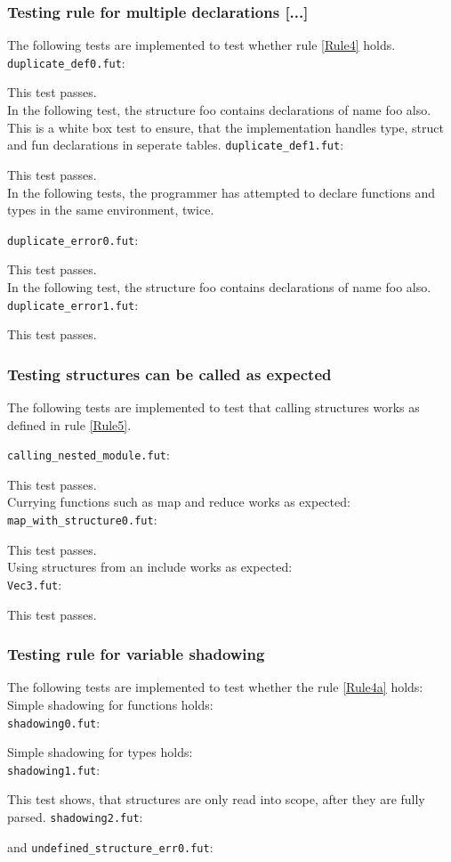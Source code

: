 \subsubsection{Testing rule for multiple declarations [...]}
The following tests are implemented to test whether rule \ref{Rule4} holds.
\texttt{duplicate\_def0.fut}:

This test passes.
\\
In the following test, the structure foo contains declarations of name foo also.
This is a white box test to ensure, that the implementation handles type, struct
and fun declarations in seperate tables.
\texttt{duplicate\_def1.fut}:

This test passes.
\\
In the following tests, the programmer has attempted to declare functions and
types in the same environment, twice.

\texttt{duplicate\_error0.fut}:

This test passes.
\\
In the following test, the structure foo contains declarations of name foo also.
\texttt{duplicate\_error1.fut}:

This test passes.

\subsubsection{Testing structures can be called as expected}
The following tests are implemented to test that calling structures works as
defined in rule \ref{Rule5}.

\texttt{calling\_nested\_module.fut}:

This test passes.
\\
Currying functions such as map and reduce works as expected:\\
\texttt{map\_with\_structure0.fut}:

This test passes.
\\
Using structures from an include works as expected:\\
\texttt{Vec3.fut}:


This test passes.
\subsubsection{Testing rule for variable shadowing}
The following tests are implemented to test whether the rule \ref{Rule4a} holds:
Simple shadowing for functions holds:\\
\texttt{shadowing0.fut}:

Simple shadowing for types holds:\\
\texttt{shadowing1.fut}:

This test shows, that structures are only read into scope, after they are fully parsed.
\texttt{shadowing2.fut}:

and
\texttt{undefined\_structure\_err0.fut}:



